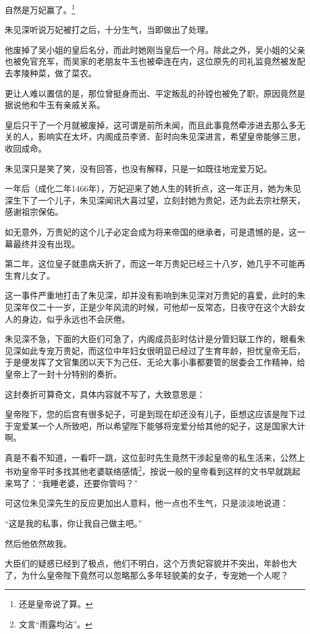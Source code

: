 \begin{multicols}{\theparacolNo}
自然是万妃赢了。\footnote{还是皇帝说了算。}

朱见深听说万妃被打之后，十分生气，当即做出了处理。

他废掉了吴小姐的皇后名分，而此时她刚当皇后一个月。除此之外，吴小姐的父亲也被免官充军，而吴家的老朋友牛玉也被牵连在内，这位原先的司礼监竟然被发配去孝陵种菜，做了菜农。

更让人难以置信的是，那位曾挺身而出、平定叛乱的孙镗也被免了职，原因竟然是据说他和牛玉有亲戚关系。

皇后只干了一个月就被废掉，这可谓是前所未闻，而且此事竟然牵涉进去那么多无关的人，影响实在太坏，内阁成员李贤、彭时向朱见深进言，希望皇帝能够三思，收回成命。

朱见深只是笑了笑，没有回答，也没有解释，只是一如既往地宠爱万妃。

一年后（成化二年1466年），万妃迎来了她人生的转折点，这一年正月，她为朱见深生下了一个儿子，朱见深闻讯大喜过望，立刻封她为贵妃，还为此去宗社祭天，感谢祖宗保佑。

如无意外，万贵妃的这个儿子必定会成为将来帝国的继承者，可是遗憾的是，这一幕最终并没有出现。

第二年，这位皇子就患病夭折了，而这一年万贵妃已经三十八岁，她几乎不可能再生育儿女了。

这一事件严重地打击了朱见深，却并没有影响到朱见深对万贵妃的喜爱，此时的朱见深年仅二十一岁，正是少年风流的时候，可他却一反常态，日夜守在这个大龄女人的身边，似乎永远也不会厌倦。

朱见深不急，下面的大臣们可急了，内阁成员彭时估计是分管妇联工作的，眼看朱见深如此专宠万贵妃，而这位中年妇女很明显已经过了生育年龄，担忧皇帝无后，于是便发挥了文官集团以天下为己任、无论大事小事都要管的居委会工作精神，给皇帝上了一封十分特别的奏折。

这封奏折可算奇文，具体内容就不写了，大致意思是：

皇帝陛下，您的后宫有很多妃子，可是到现在却还没有儿子，臣想这应该是陛下过于宠爱某一个人所致吧，所以希望陛下能够将宠爱分给其他的妃子，这是国家大计啊。

真是不看不知道，一看吓一跳，这位彭时先生竟然干涉起皇帝的私生活来，公然上书劝皇帝平时多找其他老婆联络感情\footnote{文言“雨露均沾”。}，按说一般的皇帝看到这样的文书早就跳起来骂了：“我睡老婆，还要你管吗？”

可这位朱见深先生的反应更加出人意料，他一点也不生气，只是淡淡地说道：

“这是我的私事，你让我自己做主吧。”

然后他依然故我。

大臣们的疑惑已经到了极点，他们不明白，这个万贵妃容貌并不突出，年龄也大了，为什么皇帝陛下竟然可以忽略那么多年轻貌美的女子，专宠她一个人呢？


\end{multicols}
